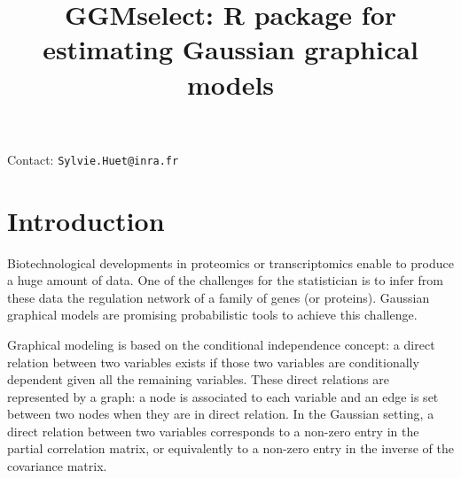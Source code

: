 \documentclass[noinfoline]{imsart}
\begin{document}
\begin{frontmatter}
\title{GGMselect:  R package for estimating Gaussian graphical models}




\end{frontmatter}


\maketitle


\centerline{{Contact:} {\tt Sylvie.Huet@inra.fr}}
\medskip

\tableofcontents

\section{Introduction}


 Biotechnological developments in proteomics or transcriptomics enable to produce a
huge amount of  data. One of the challenges
for the statistician  is to infer from these data the regulation network of a
family of  genes (or proteins). Gaussian graphical models are promising probabilistic tools to achieve this challenge.

Graphical modeling is based on the conditional independence
concept: a direct relation between two variables exists if those two
variables are conditionally dependent given all the remaining
variables. 
These direct relations are represented by a graph: a node is associated to each variable and an edge is set between two nodes when they are in direct relation.
In the Gaussian setting, a direct relation between two
variables corresponds to a non-zero entry in the partial correlation
matrix, or equivalently to a non-zero entry in the inverse of the
covariance matrix. 
\end{document}
